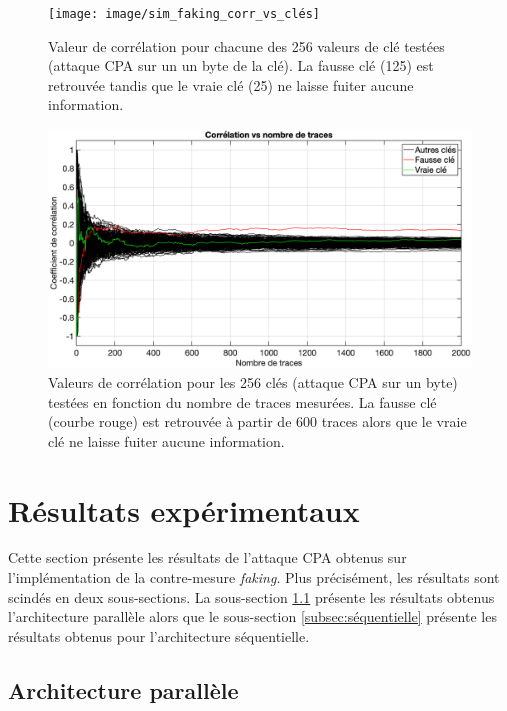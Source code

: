 \documentclass[oneside]{book}
\begin{document}
\begin{figure}[htbp]
    \hspace{-2cm}
    \texttt{[image: image/sim\_faking\_corr\_vs\_clés]}
    \caption{Valeur de corrélation pour chacune des 256 valeurs de clé testées (attaque CPA sur un un byte de la clé). La fausse clé (125) est retrouvée tandis que le vraie clé (25) ne laisse fuiter aucune information.}
    \label{fig:sim_faking_corr_vs_clés} 
    \hspace{-2cm}
    \includegraphics[scale=0.4]{image/sim_faking_corr_vs_nb_traces}
    \caption{Valeurs de corrélation pour les 256 clés (attaque CPA sur un byte) testées en fonction du nombre de traces mesurées. La fausse clé (courbe rouge) est retrouvée à partir de 600 traces alors que le vraie clé ne laisse fuiter aucune information.}
    \label{fig:sim_faking_corr_vs_nb_traces} 
\end{figure}



\section{Résultats expérimentaux}
\label{sec:Exp_Results_Faking}

Cette section présente les résultats de l'attaque CPA obtenus sur l'implémentation de la contre-mesure \textit{faking}. Plus précisément, les résultats sont scindés en deux sous-sections. La sous-section \ref{subsec:parallèle} présente les résultats obtenus l'architecture parallèle alors que le sous-section \ref{subsec:séquentielle} présente les résultats obtenus pour l'architecture séquentielle.

\subsection{Architecture parallèle}
\label{subsec:parallèle}
\end{document}
